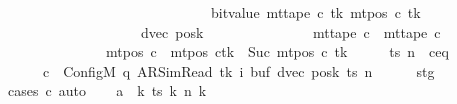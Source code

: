 \begin{isabellebody}
\ \ \ \ \ \ \ \ \ \ \ \ \ \ \ \ \ \ \ \ \ \ \ \ \ \ \ \ \ {\isacharplus}{\kern0pt}\ bit{\isacharunderscore}{\kern0pt}value\ {\isacharparenleft}{\kern0pt}mt{\isacharunderscore}{\kern0pt}tape\ c{\isacharprime}{\kern0pt}\ tk\ {\isacharparenleft}{\kern0pt}mt{\isacharunderscore}{\kern0pt}pos\ c{\isacharprime}{\kern0pt}\ tk{\isacharparenright}{\kern0pt}{\isacharparenright}{\kern0pt}{\isacharparenright}{\kern0pt}{\isacharparenright}{\kern0pt}{\isacharcomma}{\kern0pt}\isanewline
\ \ \ \ \ \ \ \ \ \ \ \ \ \ \ \ \ \ \ \ dvec{\isacharcomma}{\kern0pt}\ posk{\isacharparenright}{\kern0pt}\isanewline
\ \ \ \ \ \ \ \ \ \ \ \ \ \ {\isasymand}\ mt{\isacharunderscore}{\kern0pt}tape\ c{\isacharprime}{\kern0pt}{\isacharprime}{\kern0pt}\ {\isacharequal}{\kern0pt}\ mt{\isacharunderscore}{\kern0pt}tape\ c{\isacharprime}{\kern0pt}\isanewline
\ \ \ \ \ \ \ \ \ \ \ \ \ \ {\isasymand}\ mt{\isacharunderscore}{\kern0pt}pos\ c{\isacharprime}{\kern0pt}{\isacharprime}{\kern0pt}\ {\isacharequal}{\kern0pt}\ {\isacharparenleft}{\kern0pt}mt{\isacharunderscore}{\kern0pt}pos\ c{\isacharprime}{\kern0pt}{\isacharparenright}{\kern0pt}{\isacharparenleft}{\kern0pt}tk\ {\isacharcolon}{\kern0pt}{\isacharequal}{\kern0pt}\ Suc\ {\isacharparenleft}{\kern0pt}mt{\isacharunderscore}{\kern0pt}pos\ c{\isacharprime}{\kern0pt}\ tk{\isacharparenright}{\kern0pt}{\isacharparenright}{\kern0pt}{\isachardoublequoteclose}\isanewline
%
\isadelimproof
%
\endisadelimproof
%
\isatagproof
{}\isamarkupfalse%
\ {\isacharminus}{\kern0pt}\isanewline
\ \ \isamarkupfalse%
\ ts\ n\ \ c{\isacharprime}{\kern0pt}{\isacharunderscore}{\kern0pt}eq{\isacharcolon}{\kern0pt}\isanewline
\ \ \ \ \ \ {\isachardoublequoteopen}c{\isacharprime}{\kern0pt}\ {\isacharequal}{\kern0pt}\ Config\isactrlsub M\ {\isacharparenleft}{\kern0pt}q{\isacharcomma}{\kern0pt}\ AR{\isacharunderscore}{\kern0pt}SimRead{\isacharcomma}{\kern0pt}\ tk{\isacharcomma}{\kern0pt}\ i{\isacharcomma}{\kern0pt}\ buf{\isacharcomma}{\kern0pt}\ dvec{\isacharcomma}{\kern0pt}\ posk{\isacharparenright}{\kern0pt}\ ts\ n{\isachardoublequoteclose}\isanewline
\ \ \ \ \isamarkupfalse%
\ stg\ \isamarkupfalse%
\ {\isacharparenleft}{\kern0pt}cases\ c{\isacharprime}{\kern0pt}{\isacharparenright}{\kern0pt}\ auto\isanewline
\ \ \isamarkupfalse%
\ {\isacharquery}{\kern0pt}a\ {\isacharequal}{\kern0pt}\ {\isachardoublequoteopen}{\isasymlambda}k{\isachardot}{\kern0pt}\ ts\ k\ {\isacharparenleft}{\kern0pt}n\ k{\isacharparenright}{\kern0pt}{\isachardoublequoteclose}\isanewline
\ \ \isamarkupfalse%

\end{isabellebody}
